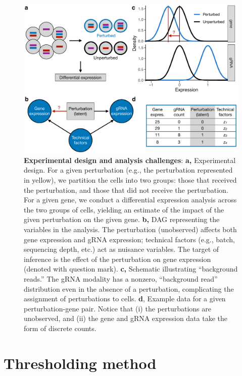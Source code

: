 \documentclass[12pt]{article}
\begin{document}
\begin{figure}[h!]
	\centering
	\includegraphics[width=1\linewidth]{../../figures/analysis_challenges/plot.pdf}
	\caption{\textbf{Experimental design and analysis challenges}: \textbf{a,} Experimental design. For a given perturbation (e.g., the perturbation represented in yellow), we partition the cells into two groups: those that received the perturbation, and those that did not receive the perturbation. For a given gene, we conduct a differential expression analysis across the two groups of cells, yielding an estimate of the impact of the given perturbation on the given gene. \textbf{b,} DAG representing the variables in the analysis. The perturbation (unobserved) affects both gene expression and gRNA expression; technical factors (e.g., batch, sequencing depth, etc.) act as nuisance variables. The target of inference is the effect of the perturbation on gene expression (denoted with question mark). \textbf{c,} Schematic illustrating ``background reads.'' The gRNA modality has a nonzero, ``background read'' distribution even in the absence of a perturbation, complicating the assignment of perturbations to cells. \textbf{d}, Example data for a given perturbation-gene pair. Notice that (i) the perturbations are unobserved, and (ii) the gene and gRNA expression data take the form of discrete counts.}
	\label{analysis_challenges}
\end{figure}

\section{Thresholding method}
\end{document}
